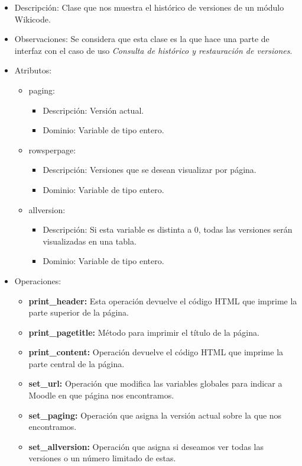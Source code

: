 \begin{itemize}
	\item Descripción: Clase que nos muestra el histórico de versiones de un módulo Wikicode.
	\item Observaciones: Se considera que esta clase es la que hace una parte de interfaz con el caso de uso \emph{Consulta de histórico y restauración de versiones}.
	\item Atributos:
		\begin{itemize}
			\item paging:
				\begin{itemize}
					\item Descripción: Versión actual.
					\item Dominio: Variable de tipo entero.
				\end{itemize}
			\item rowsperpage:
				\begin{itemize}
					\item Descripción: Versiones que se desean visualizar por página.
					\item Dominio: Variable de tipo entero.
				\end{itemize}
			\item allversion:
				\begin{itemize}
					\item Descripción: Si esta variable es distinta a 0, todas las versiones serán visualizadas en una tabla.
					\item Dominio: Variable de tipo entero.
				\end{itemize}
		\end{itemize}
	\item Operaciones:
		\begin{itemize}
			\item \textbf{print\_header: }Esta operación devuelve el código HTML que imprime la parte superior de la página.
			\item \textbf{print\_pagetitle: }Método para imprimir el título de la página.
			\item \textbf{print\_content: }Operación devuelve el código HTML que imprime la parte central de la página.
			\item \textbf{set\_url: }Operación que modifica las variables globales para indicar a Moodle en que página nos encontramos.
			\item \textbf{set\_paging: }Operación que asigna la versión actual sobre la que nos encontramos.
			\item \textbf{set\_allversion: }Operación que asigna si deseamos ver todas las versiones o un número limitado de estas.

\end{itemize}
\end{itemize}
